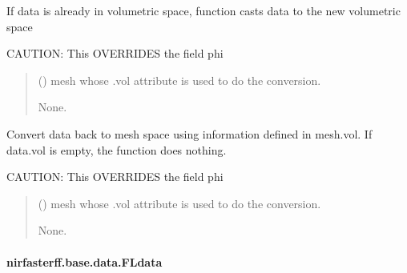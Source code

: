 \documentclass[letterpaper,10pt,english]{sphinxmanual}
\begin{document}
\begin{fulllineitems}
\begin{fulllineitems}
\sphinxAtStartPar
If data is already in volumetric space, function casts data to the new volumetric space

\sphinxAtStartPar
CAUTION: This OVERRIDES the field phi
\begin{quote}\begin{description}
\sphinxAtStartPar
{} () \textendash{} mesh whose .vol attribute is used to do the conversion.

\sphinxAtStartPar
None.

\end{description}\end{quote}

\end{fulllineitems}


\begin{fulllineitems}
\label{\detokenize{_autosummary/nirfasterff.base.data.FDdata:nirfasterff.base.data.FDdata.tomesh}}
\pysigstartsignatures
{}
\pysigstopsignatures
\sphinxAtStartPar
Convert data back to mesh space using information defined in mesh.vol. If data.vol is empty, the function does nothing.

\sphinxAtStartPar
CAUTION: This OVERRIDES the field phi
\begin{quote}\begin{description}
\sphinxAtStartPar
{} () \textendash{} mesh whose .vol attribute is used to do the conversion.

\sphinxAtStartPar
None.

\end{description}\end{quote}

\end{fulllineitems}


\end{fulllineitems}


\sphinxstepscope


\paragraph{nirfasterff.base.data.FLdata}
\label{\detokenize{_autosummary/nirfasterff.base.data.FLdata:nirfasterff-base-data-fldata}}\label{\detokenize{_autosummary/nirfasterff.base.data.FLdata::doc}}
\end{document}
